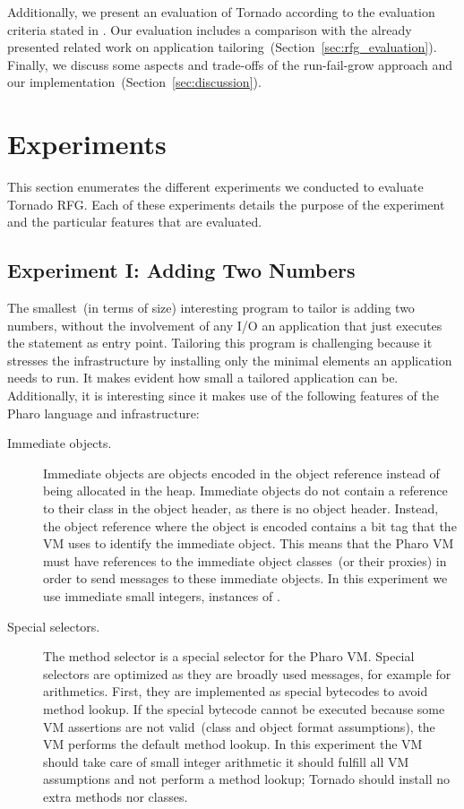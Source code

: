 Additionally, we present an evaluation of Tornado according to the evaluation criteria stated in . Our evaluation includes a comparison with the already presented related work on application tailoring~(Section~\ref{sec:rfg_evaluation}).
Finally, we discuss some aspects and trade-offs of the run-fail-grow approach and our implementation~(Section~\ref{sec:discussion}).

\section{Experiments}\label{sec:rfg_experiments}

This section enumerates the different experiments we conducted to evaluate Tornado RFG. Each of these experiments details the purpose of the experiment and the particular features that are evaluated.

\subsection*{Experiment I: Adding Two Numbers}

The smallest~(in terms of size) interesting program to tailor is adding two numbers, without the involvement of any I/O \ie an application that just executes the  statement as entry point. Tailoring this program is challenging because it stresses the infrastructure by installing only the minimal elements an application needs to run. It makes evident how small a tailored application can be. Additionally, it is interesting since it makes use of the following features of the Pharo language and infrastructure:

\begin{description}
\item[Immediate objects.] Immediate objects are objects encoded in the object reference instead of being allocated in the heap. Immediate objects do not contain a reference to their class in the object header, as there is no object header. Instead, the object reference where the object is encoded contains a bit tag that the VM uses to identify the immediate object. This means that the Pharo VM must have references to the immediate object classes~(or their proxies) in order to send messages to these immediate objects. In this experiment we use immediate small integers, instances of .
\item[Special selectors.] The method selector \ct{+} is a special selector for the Pharo VM. Special selectors are optimized as they are broadly used messages, for example for arithmetics. First, they are implemented as special bytecodes to avoid method lookup. If the special bytecode cannot be executed because some VM assertions are not valid~(\eg class and object format assumptions), the VM performs the default method lookup. In this experiment the VM should take care of small integer arithmetic \ie it should fulfill all VM assumptions and not perform a method lookup; Tornado should install no extra methods nor classes.
\end{description}

